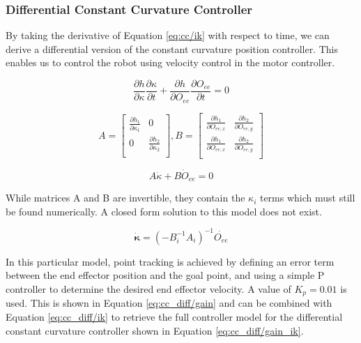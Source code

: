 \subsubsection{Differential Constant Curvature Controller}
By taking the derivative of Equation \eqref{eq:cc/ik} with respect to time, we can derive a differential version of the constant curvature position controller. This enables us to control the robot using velocity control in the motor controller. 

\begin{equation*}\label{eq:cc_diff/intial}
    \frac{\partial h}{\partial \kappa}\frac{\partial \kappa}{\partial t} + \frac{\partial h}{\partial O_{ee}}\frac{\partial O_{ee}}{\partial t} = 0
\end{equation*}

\begin{equation*}\label{eq:cc_diff/matrices}
    A = \begin{bmatrix}
        \displaystyle\frac{\partial h_1}{\partial \kappa_1} & 0\\
        0 & \displaystyle\frac{\partial h_2}{\partial \kappa_2} \\
        \end{bmatrix}, 
    B = \begin{bmatrix}
        \displaystyle\frac{\partial h_1}{\partial O_{ee, x}} & \displaystyle\frac{\partial h_2}{\partial O_{ee, y}}\\
        \displaystyle\frac{\partial h_1}{\partial O_{ee, x}} & \displaystyle\frac{\partial h_2}{\partial O_{ee, y}} \\
        \end{bmatrix}
\end{equation*}

\begin{equation*}
    A \dot \kappa + B \dot O_{ee} = 0 
\end{equation*}

While matrices A and B are invertible, they contain the $\kappa_i$ terms which must still be found numerically. A closed form solution to this model does not exist. 

\begin{equation}\label{eq:cc_diff/ik}
    \mathbf{\dot{\kappa}} = (-B^{-1}_iA_i)^{-1}\dot{O_{ee}} 
\end{equation}

In this particular model, point tracking is achieved by defining an error term between the end effector position and the goal point, and using a simple P controller to determine the desired end effector velocity. A value of $K_p = 0.01$ is used. This is shown in Equation \eqref{eq:cc_diff/gain} and can be combined with Equation \eqref{eq:cc_diff/ik} to retrieve the full controller model for the differential constant curvature controller shown in Equation \eqref{eq:cc_diff/gain_ik}. 

